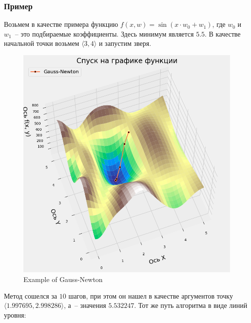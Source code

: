 \documentclass[12pt, a4paper, oneside, final]{article}
\begin{document}
	\subsubsection*{Пример}
	Возьмем в качестве примера функцию $f(x, w) = \sin{(x \cdot w_{0} + w_{1})}$, где $w_{0}$ и $w_{1}$~-- это подбираемые коэффициенты.
	Здесь минимум является $5.5$.
	В качестве начальной точки возьмем $\langle 3, 4 \rangle$ и запустим зверя.
	\begin{figure}[H]
		\centering
		\includegraphics[scale = 0.55]{Image/T1_GAUSS_NEWTON_3D_PLOT_1.png}
		\caption*{Example of Gauss-Newton}
	\end{figure}
	Метод сошелся за $10$ шагов, при этом он нашел в качестве аргументов точку $\langle 1.997695, 2.998286 \rangle$, а~-- значения $5.532247$.
	Тот же путь алгоритма в виде линий уровня:
\end{document}
